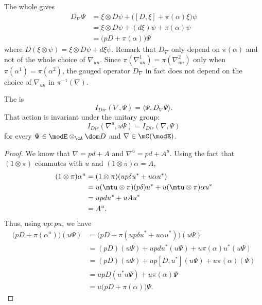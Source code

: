 The whole gives
\[ 
\begin{split}
  D_{\nabla}\Psi&=\xi\otimes D\psi+\big( [D,\xi]+\pi(\alpha)\xi \big)\psi\\
		&=\xi\otimes D\psi+(d\xi)\psi+\pi(\alpha)\psi\\
		&=\big( pD+\pi(\alpha) \big)\Psi
\end{split}
\]
where $D(\xi\otimes\psi)=\xi\otimes D\psi+d\xi\psi$. Remark that $D_{\nabla}$ only depend on $\pi(\alpha)$ and not of the whole choice of $\nabla_{un}$. Since $\pi(\nabla^1_{un})=\pi(\nabla^2_{un})$ only when $\pi(\alpha^1)=\pi(\alpha^2)$, the gauged operator $D_{\nabla}$ in fact does not depend on the choice of $\nabla_{un}$ in $\pi^{-1}(\nabla)$.

\begin{proposition}
The  is
\begin{equation}
I_{Dir}(\nabla,\Psi)=\langle \Psi, D_{\nabla}\Psi\rangle.
\end{equation}
That action is invariant under the unitary group:
\[ 
  I_{Dir}(\nabla^u,u\Psi)=I_{Dir}(\nabla,\Psi)
\]
for every $\Psi\in\modE\otimes_{\cA}\dom D$ and $\nabla\in \mC(\modE)$. 
\end{proposition}

\begin{proof}
We know that $\nabla=pd+A$ and $\nabla^u=pd+A^u$. Using the fact that $(1\otimes\pi)$ commutes with $u$ and $(1\otimes\pi)\alpha=A$,
\[ 
\begin{split}
(1\otimes\pi)\alpha^u&=(1\otimes\pi)(up\delta u^*+u\alpha u^*)\\
		&=u(\mtu\otimes\pi)(p\delta)u^*+u(\mtu\otimes\pi)\alpha u^*\\
		&=updu^*+uAu^*\\
		&=A^u.
\end{split}  
\]
Thus, using $up:pu$,  we have
\begin{align}
\big( pD+\pi(\alpha^u) \big)(u\Psi)&=\big( pD+\pi(up\delta u^*+u\alpha u^*) \big)(u\Psi)\\
		&=(pD)(u\Psi)+updu^*(u\Psi)+u\pi(\alpha)u^*(u\Psi)\\
		&=(pD)(u\Psi)+up[D,u^*](u\Psi)+u\pi(\alpha)(\Psi)\\
		&=upD(u^*u\Psi)+u\pi(\alpha)\Psi\\
		&=u\big( pD+\pi(\alpha) \big)\Psi.
\end{align}

\end{proof}




